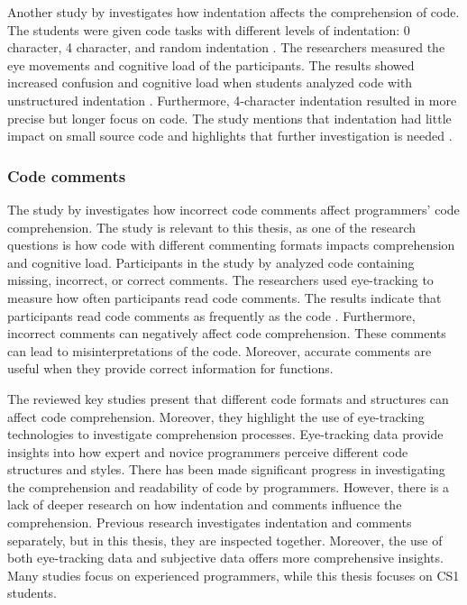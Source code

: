 Another study by \citet{yorimoto2024quantitative} investigates how indentation affects the comprehension of code. The students were given code tasks with different levels of indentation: 0 character, 4 character, and random indentation \cite{yorimoto2024quantitative}. The researchers measured the eye movements and cognitive load of the participants. The results showed increased confusion and cognitive load when students analyzed code with unstructured indentation \cite{yorimoto2024quantitative}. Furthermore, 4-character indentation resulted in more precise but longer focus on code. The study mentions that indentation had little impact on small source code and highlights that further investigation is needed \cite{yorimoto2024quantitative}.  

\subsubsection{Code comments} 

The study by  \citet{bakhuizen2019comments} investigates how incorrect code comments affect programmers' code comprehension. The study is relevant to this thesis, as one of the research questions is how code with different  commenting formats impacts comprehension and cognitive load.  Participants in the study by  \citet{bakhuizen2019comments} analyzed code containing missing, incorrect, or correct comments.
The researchers used eye-tracking to measure how often participants read code comments. The results indicate that participants read code comments as frequently as the code \cite{bakhuizen2019comments}. Furthermore, incorrect comments can negatively affect code comprehension. These comments can lead to misinterpretations of the code. Moreover, accurate comments are useful when they provide correct information for functions. 

The reviewed key studies present that different code formats and structures can affect code comprehension. Moreover, they highlight the use of eye-tracking technologies to investigate comprehension processes.  Eye-tracking data provide insights into how expert and novice programmers perceive different code structures and styles. There has been made significant progress in investigating the comprehension and readability of code by programmers.  However, there is a lack of deeper research on how indentation and comments influence the comprehension.  Previous research investigates indentation and comments separately, but in this thesis, they are inspected together. Moreover, the use of both eye-tracking data and subjective data offers more comprehensive insights. Many studies focus on experienced programmers, while this thesis focuses on CS1 students. 





